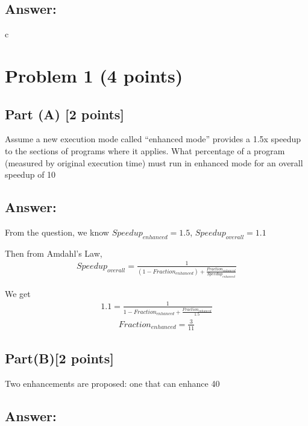 \documentclass[letter,11pt,leqno]{article}
\begin{document}
\subsection*{Answer:} c

\section*{Problem 1 (4 points)}

\subsection*{Part (A) [2 points]}

Assume a new execution mode called “enhanced mode” provides a 1.5x speedup to the sections of programs where it applies. What percentage of a program (measured by original execution time) must run in enhanced mode for an overall speedup of 10%

\subsection*{Answer:}
From the question, we know $Speedup_{enhanced} = 1.5$, $Speedup_{overall} = 1.1$

Then from Amdahl's Law, 
\begin{eqnarray*}
  Speedup_{overall} = \frac{1}
  {(1-Fraction_{enhanced}) + \frac{Fraction_{enhanced}}{Speedup_{enhanced}}}
\end{eqnarray*}

We get
\begin{eqnarray*}
  1.1 = \frac{1}{1-Fraction_{enhanced}+\frac{Fraction_{enhanced}}{1.5}}
\end{eqnarray*}
\begin{eqnarray*}
  Fraction_{enhanced} = \frac{3}{11}
\end{eqnarray*}

\subsection{Part(B)[2 points]}Two enhancements are proposed: one that can enhance 40%

\subsection{Answer:}
\end{document}

